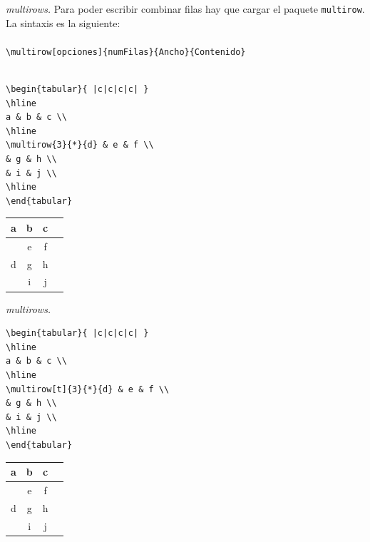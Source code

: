 \documentclass[dvipsnames,xcolor, handout]{beamer}
\theoremstyle{plain}
\theoremstyle{definition}
\begin{document}
\begin{frame}[fragile]{\itshape multirows.}
    Para poder escribir combinar filas hay que cargar el paquete \verb!multirow!. La sintaxis es la siguiente:\\~\\ \verb!\multirow[opciones]{numFilas}{Ancho}{Contenido}!\pause\\~\\
    
    
\begin{minipage}{0.6\linewidth}
\begin{verbatim}
\begin{tabular}{ |c|c|c|c| } 
\hline
a & b & c \\
\hline
\multirow{3}{*}{d} & e & f \\ 
& g & h \\ 
& i & j \\ 
\hline
\end{tabular}
\end{verbatim}    
\end{minipage}\pause
\begin{minipage}{0.3\linewidth}
\begin{tabular}{ |c|c|c|c| } 
\hline
a & b & c \\
\hline
\multirow{3}{*}{d} & e & f \\ 
& g & h \\ 
& i & j \\ 
\hline
\end{tabular}
\end{minipage}
\end{frame}

\begin{frame}[fragile]{\itshape multirows.}
\begin{minipage}{0.6\linewidth}
\begin{verbatim}
\begin{tabular}{ |c|c|c|c| } 
\hline
a & b & c \\
\hline
\multirow[t]{3}{*}{d} & e & f \\ 
& g & h \\ 
& i & j \\ 
\hline
\end{tabular}
\end{verbatim}    
\end{minipage}
\begin{minipage}{0.3\linewidth}
\centering
\begin{tabular}{ |c|c|c|c| } 
\hline
a & b & c \\
\hline
\multirow[t]{3}{*}{d} & e & f \\ 
& g & h \\ 
& i & j \\ 
\hline
\end{tabular}
\end{minipage}
\end{frame}
\end{document}
